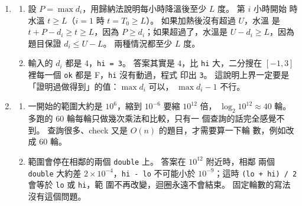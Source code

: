 \begin{enumerate}
\item
\begin{enumerate}
\item 設 $P = \max d_i$，用歸納法說明每小時降溫後至少 $L$ 度。 第 $i$ 小時開始
時水溫 $t \ge L$（$i = 1$ 時 $t = T_0 \ge L$）。 如果加熱後沒有超過 $U$，水溫
是 $t + P - d_i \ge t \ge L$，因為 $P \ge d_i$；如果超過了，水溫是
$U - d_i \ge L$，因為題目保證 $d_i \le U - L$。 兩種情況都至少 $L$ 度。
\item 輸入的 $d_i$ 都是 $4$，\texttt{hi = 3}。 答案其實是 $4$，比 \texttt{hi}
大，二分搜在 $[-1, 3]$ 裡每一個 \texttt{ok} 都是 F，\texttt{hi} 沒有動過，程式
印出 \texttt{3}。 這說明上界一定要是「證明過做得到」的值：$\max d_i$ 可以，
$\max d_i - 1$ 不行。
\end{enumerate}

\item
\begin{enumerate}
\item 一開始的範圍大約是 $10^6$，縮到 $10^{-6}$ 要縮 $10^{12}$ 倍，
$\log_2 10^{12} \approx 40$ 輪。 多跑的 $60$ 輪每輪只做幾次乘法和比較，只有一
個查詢的話完全感覺不到。 查詢很多、check 又是 $O(n)$ 的題目，才需要算一下輪
數，例如改成 $60$ 輪。
\item 範圍會停在相鄰的兩個 \texttt{double} 上。 答案在 $10^{12}$ 附近時，相鄰
兩個 \texttt{double} 大約差 $2 \times 10^{-4}$，\texttt{hi - lo} 不可能小於
$10^{-9}$；這時 \texttt{(lo + hi) / 2} 會等於 \texttt{lo} 或 \texttt{hi}，範
圍不再改變，迴圈永遠不會結束。 固定輪數的寫法沒有這個問題。
\end{enumerate}
\end{enumerate}
